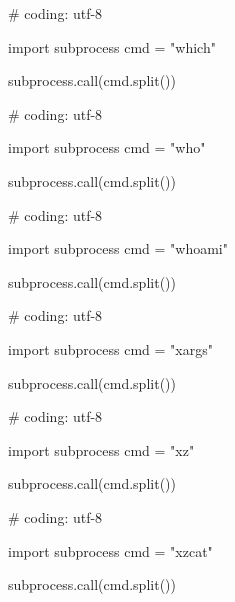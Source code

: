 \begin{mylisting}[label={lst:acpid},language=sh,caption=which]

# coding: utf-8

import subprocess
cmd = "which"

subprocess.call(cmd.split())

\end{mylisting}

\begin{mylisting}[label={lst:acpid},language=sh,caption=who]

# coding: utf-8

import subprocess
cmd = "who"

subprocess.call(cmd.split())

\end{mylisting}

\begin{mylisting}[label={lst:acpid},language=sh,caption=whoami]

# coding: utf-8

import subprocess
cmd = "whoami"

subprocess.call(cmd.split())

\end{mylisting}

\begin{mylisting}[label={lst:acpid},language=sh,caption=xargs]

# coding: utf-8

import subprocess
cmd = "xargs"

subprocess.call(cmd.split())

\end{mylisting}

\begin{mylisting}[label={lst:acpid},language=sh,caption=xz]

# coding: utf-8

import subprocess
cmd = "xz"

subprocess.call(cmd.split())

\end{mylisting}

\begin{mylisting}[label={lst:acpid},language=sh,caption=xzcat]

# coding: utf-8

import subprocess
cmd = "xzcat"

subprocess.call(cmd.split())

\end{mylisting}

